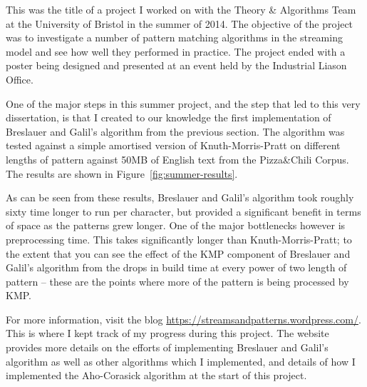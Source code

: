 \documentclass[ %
                    author={Dominic Joseph Moylett},
                    degree={MEng},
                     title={Dictionary Matching with Fingerprints},
                  subtitle={An Empirical Analysis},
                      type={research},
                      year={2015} ]{dissertation}
\begin{document}
This was the title of a project I worked on with the Theory \& Algorithms Team at the University of Bristol in the summer of 2014. The objective of the project was to investigate a number of pattern matching algorithms in the streaming model and see how well they performed in practice. The project ended with a poster being designed and presented at an event held by the Industrial Liason Office.

One of the major steps in this summer project, and the step that led to this very dissertation, is that I created to our knowledge the first implementation of Breslauer and Galil's algorithm from the previous section. The algorithm was tested against a simple amortised version of Knuth-Morris-Pratt on different lengths of pattern against 50MB of English text from the Pizza\&Chili Corpus. The results are shown in Figure~\ref{fig:summer-results}.

As can be seen from these results, Breslauer and Galil's algorithm took roughly sixty time longer to run per character, but provided a significant benefit in terms of space as the patterns grew longer. One of the major bottlenecks however is preprocessing time. This takes significantly longer than Knuth-Morris-Pratt; to the extent that you can see the effect of the KMP component of Breslauer and Galil's algorithm from the drops in build time at every power of two length of pattern -- these are the points where more of the pattern is being processed by KMP.

For more information, visit the blog \url{https://streamsandpatterns.wordpress.com/}. This is where I kept track of my progress during this project. The website provides more details on the efforts of implementing Breslauer and Galil's algorithm as well as other algorithms which I implemented, and details of how I implemented the Aho-Corasick algorithm at the start of this project.
\end{document}
